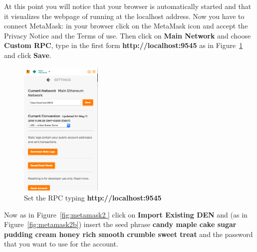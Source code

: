 At this point you will notice that your browser is automatically started and that it visualizes the webpage of \ProjectName{} running at the localhost address. Now you have to connect MetaMask: in your browser click on the MetaMask icon and accept the Privacy Notice and the Terms of use. Then click on \textbf{Main Network} and choose \textbf{Custom RPC}, type in the first form \textbf{http://localhost:9545} as in Figure~\ref{fig:metamask1} and click \textbf{Save}.
\begin{figure}[H]
	\centering
	\includegraphics[width=0.35\textwidth]{img/settings.png}
	\caption{Set the RPC typing \textbf{http://localhost:9545}}
	\label{fig:metamask1}
\end{figure}

Now as in Figure~\ref{fig:metamask2 }  click on \textbf{Import Existing DEN} and (as in Figure~\ref{fig:metamask2b}) insert the seed phrase \textbf{candy maple cake sugar pudding cream honey rich smooth crumble sweet treat} and the password that you want to use for the account.

